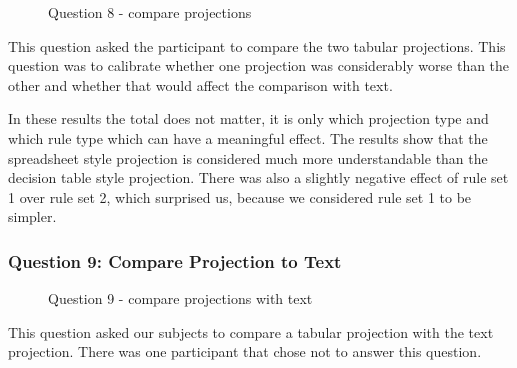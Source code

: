 \begin{figure}[H]
    \centering
    \caption{Question 8 - compare projections}
    \label{fig:stackedbar_Q4}
\end{figure}

This question asked the participant to compare the two tabular projections.  
This question was to calibrate whether one projection was considerably worse than the other and whether that would affect the comparison with text.

In these results the total does not matter, it is only which projection type and which rule type which can have a meaningful effect.
The results show that the spreadsheet style projection is considered much more understandable than the decision table style projection.
There was also a slightly negative effect of rule set 1 over rule set 2, which surprised us, because we considered rule set 1 to be simpler.

\subsubsection{Question 9: Compare Projection to Text}

\begin{figure}[H]
    \centering
    \caption{Question 9 - compare projections with text}
    \label{fig:stackedbar_Q5}
\end{figure}

This question asked our subjects to compare a tabular projection with the text projection.
There was one participant that chose not to answer this question.

